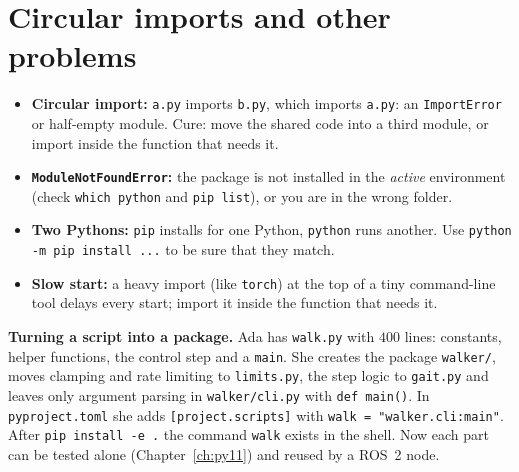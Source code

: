 \section*{Circular imports and other problems}
\begin{itemize}[nosep]
  \item \textbf{Circular import:} \texttt{a.py} imports \texttt{b.py}, which imports \texttt{a.py}: an \texttt{ImportError} or half-empty module. Cure: move the shared code into a third module, or import inside the function that needs it.
  \item \textbf{\texttt{ModuleNotFoundError}:} the package is not installed in the \emph{active} environment (check \verb!which python! and \verb!pip list!), or you are in the wrong folder.
  \item \textbf{Two Pythons:} \texttt{pip} installs for one Python, \texttt{python} runs another. Use \verb!python -m pip install ...! to be sure that they match.
  \item \textbf{Slow start:} a heavy import (like \texttt{torch}) at the top of a tiny command-line tool delays every start; import it inside the function that needs it.
\end{itemize}

\begin{example}
\textbf{Turning a script into a package.} Ada has \texttt{walk.py} with $400$ lines: constants, helper functions, the control step and a \texttt{main}. She creates the package \texttt{walker/}, moves clamping and rate limiting to \texttt{limits.py}, the step logic to \texttt{gait.py} and leaves only argument parsing in \texttt{walker/cli.py} with \verb!def main()!. In \texttt{pyproject.toml} she adds \texttt{[project.scripts]} with \verb!walk = "walker.cli:main"!. After \verb!pip install -e .! the command \texttt{walk} exists in the shell. Now each part can be tested alone (Chapter~\ref{ch:py11}) and reused by a ROS~2 node.
\end{example}

